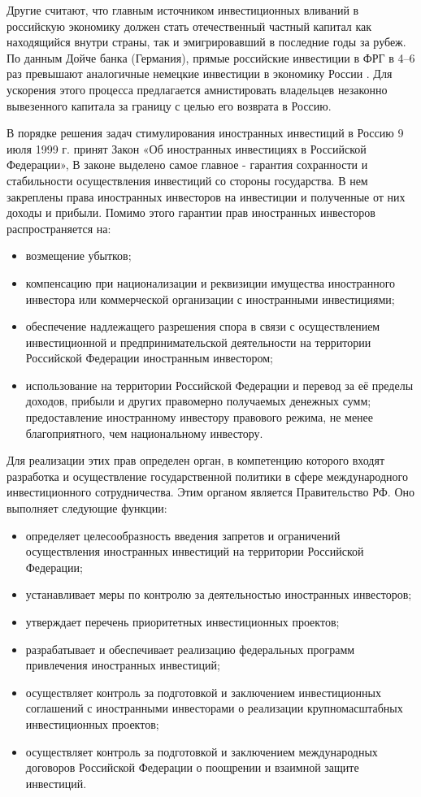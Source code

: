 Другие считают, что главным источником инвестиционных вливаний в российскую экономику должен стать отечественный частный капитал как находящийся внутри страны, так и эмигрировавший в последние годы за рубеж. По данным Дойче банка (Германия), прямые российские инвестиции в ФРГ в 4--6 раз превышают аналогичные немецкие инвестиции в экономику России . Для ускорения этого процесса предлагается амнистировать владельцев незаконно вывезенного капитала за границу с целью его возврата в Россию.

В порядке решения задач стимулирования иностранных инвестиций в Россию 9 июля 1999 г. принят Закон «Об иностранных инвестициях в Российской Федерации», В законе выделено самое главное - гарантия сохранности и стабильности осуществления инвестиций со стороны государства. В нем закреплены права иностранных инвесторов на инвестиции и полученные от них доходы и прибыли. Помимо этого гарантии прав иностранных инвесторов распространяется на:
\begin{itemize}
	\item возмещение убытков;
\item компенсацию при национализации и реквизиции имущества иностранного инвестора или коммерческой организации с иностранными инвестициями;
\item обеспечение надлежащего разрешения спора в связи с осуществлением инвестиционной и предпринимательской деятельности на территории Российской Федерации иностранным инвестором;
\item использование на территории Российской Федерации и перевод за её пределы доходов, прибыли и других правомерно получаемых денежных сумм;
предоставление иностранному инвестору правового режима, не менее благоприятного, чем национальному инвестору.
\end{itemize}

Для реализации этих прав определен орган, в компетенцию которого входят разработка и осуществление государственной политики в сфере международного инвестиционного сотрудничества. Этим органом является Правительство РФ. Оно выполняет следующие функции:
\begin{itemize}
	\item определяет целесообразность введения запретов и ограничений осуществления иностранных инвестиций на территории Российской Федерации;
\item устанавливает меры по контролю за деятельностью иностранных инвесторов;
\item утверждает перечень приоритетных инвестиционных проектов;
\item разрабатывает и обеспечивает реализацию федеральных программ привлечения иностранных инвестиций;
\item осуществляет контроль за подготовкой и заключением инвестиционных соглашений с иностранными инвесторами о реализации крупномасштабных инвестиционных проектов;
\item осуществляет контроль за подготовкой и заключением международных договоров Российской Федерации о поощрении и взаимной защите инвестиций.
\end{itemize}

